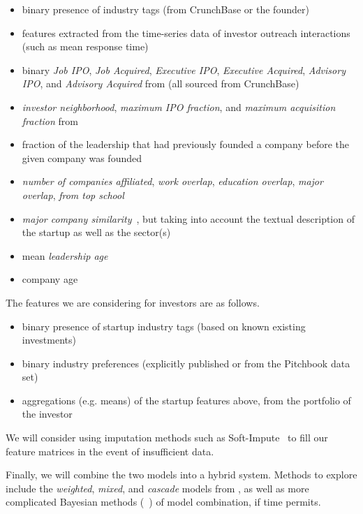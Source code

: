 \begin{itemize}
  \item binary presence of industry tags (from CrunchBase or the founder)
  \item features extracted from the time-series data of investor outreach interactions (such as mean response time)
  \item binary \textit{Job IPO}, \textit{Job Acquired}, \textit{Executive IPO}, \textit{Executive Acquired}, \textit{Advisory IPO}, and \textit{Advisory Acquired} from \cite{2017arXiv170604229H} (all sourced from CrunchBase)
  \item \textit{investor neighborhood}, \textit{maximum IPO fraction}, and \textit{maximum acquisition fraction} from \cite{2017arXiv170604229H}
  \item fraction of the leadership that had previously founded a company before the given company was founded~\cite{2017arXiv170604229H}
  \item \textit{number of companies affiliated}, \textit{work overlap}, \textit{education overlap}, \textit{major overlap}, \textit{from top school}~\cite{2017arXiv170604229H}
  \item \textit{major company similarity}~\cite{2017arXiv170604229H}, but taking into account the textual description of the startup as well as the sector(s)
  \item mean \textit{leadership age}~\cite{2017arXiv170604229H}
  \item company age
\end{itemize}

The features we are considering for investors are as follows.

\begin{itemize}
  \item binary presence of startup industry tags (based on known existing investments)
  \item binary industry preferences (explicitly published or from the Pitchbook data set)
  \item aggregations (e.g. means) of the startup features above, from the portfolio of the investor
\end{itemize}

We will consider using imputation methods such as Soft-Impute~\cite{mazumder2010spectral} to fill our feature matrices in the event of insufficient data.

Finally, we will combine the two models into a hybrid system. Methods to explore include the \textit{weighted}, \textit{mixed}, and \textit{cascade} models from \cite{Burke2002}, as well as more complicated Bayesian methods (~\cite{DECAMPOS2010785}) of model combination, if time permits.
